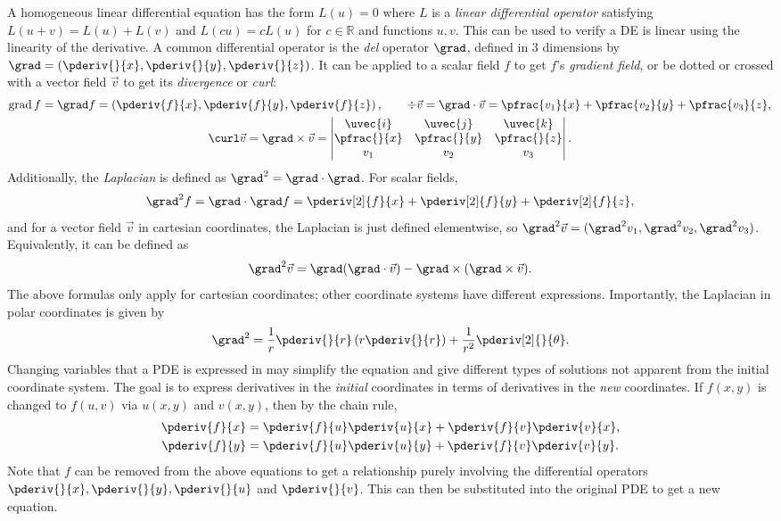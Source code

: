 \documentclass[10pt, a4paper]{article}
\begin{document}
\begin{landscape}
\begin{multicols}{2}
    A homogeneous linear differential equation has the form \(L(u) = 0\) where \(L\) is a
    \emph{linear differential operator} satisfying \(L(u+v) = L(u) + L(v)\) and
    \(L(cu) = c L(u)\) for \(c \in \mathbb{R}\) and functions \(u, v\). This can be used
    to verify a DE is linear using the linearity of the derivative. A common differential operator
    is the \emph{del} operator \(\grad\), defined in 3 dimensions by
    \(\grad = (\pderiv{}{x}, \pderiv{}{y}, \pderiv{}{z})\). It can be applied to a scalar field
    \(f\) to get \(f\)'s \emph{gradient field}, or be dotted or crossed with a vector field \(\vec{v}\)
    to get its \emph{divergence} or \emph{curl}:
    \begin{gather*}
        \operatorname{grad} f = \grad f = \left(\pderiv{f}{x}, \pderiv{f}{y}, \pderiv{f}{z}\right),
        \qquad
        \div \vec{v} = \grad \cdot \vec{v} = \pfrac{v_1}{x} + \pfrac{v_2}{y} + \pfrac{v_3}{z}, \\
        \curl \vec{v} = \grad \times \vec{v} = 
        \begin{vmatrix}
            \uvec{i} & \uvec{j} & \uvec{k} \\
            \pfrac{}{x} & \pfrac{}{y} & \pfrac{}{z} \\
            v_1 & v_2 & v_3
        \end{vmatrix}.
    \end{gather*}
    Additionally, the \emph{Laplacian} is defined as \(\grad^2 = \grad \cdot \grad\). For scalar fields,
    \[
        \grad^2 f = \grad \cdot \grad f = \pderiv[2]{f}{x} + \pderiv[2]{f}{y} + \pderiv[2]{f}{z},
    \]
    and for a vector field \(\vec{v}\) in cartesian coordinates, the Laplacian is just defined
    elementwise, so \(\grad^2 \vec{v} = (\grad^2 v_1, \grad^2 v_2, \grad^2 v_3)\).
    Equivalently, it can be defined as
    \[
        \grad^2 \vec{v} = \grad(\grad \cdot \vec{v}) - \grad \times (\grad \times \vec{v}).
    \]
    The above formulas only apply for cartesian coordinates; other coordinate systems have
    different expressions. Importantly, the Laplacian in polar coordinates is given by
    \[
        \grad^2 = \frac{1}{r} \pderiv{}{r} \left(r \pderiv{}{r}\right) + \frac{1}{r^2} \pderiv[2]{}{\theta}.
    \]
    Changing variables that a PDE is expressed in may simplify the equation and give different
    types of solutions not apparent from the initial coordinate system.
    The goal is to express derivatives in the \emph{initial} coordinates in terms of
    derivatives in the \emph{new} coordinates. If \(f(x, y)\) is changed to \(f(u, v)\) via
    \(u(x, y)\) and \(v(x, y)\), then by the chain rule,
    \begin{align*}
        \pderiv{f}{x} &= \pderiv{f}{u} \pderiv{u}{x} + \pderiv{f}{v} \pderiv{v}{x}, \\
        \pderiv{f}{y} &= \pderiv{f}{u} \pderiv{u}{y} + \pderiv{f}{v} \pderiv{v}{y}.
    \end{align*}
    Note that \(f\) can be removed from the above equations to get a relationship purely involving
    the differential operators \(\pderiv{}{x}, \pderiv{}{y}, \pderiv{}{u}\) and \(\pderiv{}{v}\).
    This can then be substituted into the original PDE to get a new equation.


\end{multicols}
\end{landscape}
\end{document}
